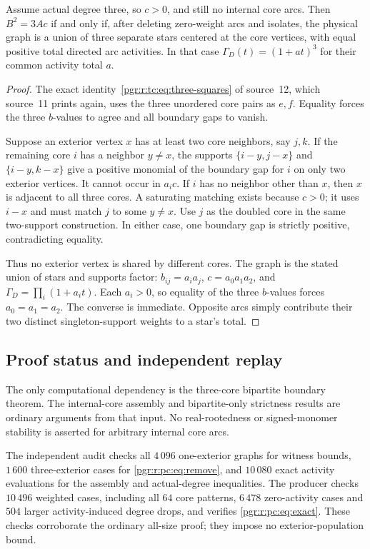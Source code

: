 \documentclass[11pt]{article}
\numberwithin{equation}{section}
\theoremstyle{definition}\newtheorem{definition}[theorem]{Definition}\newtheorem{remark}[theorem]{Remark}
\newcommand{\Ga}{\Gamma}                   %
\begin{document}
\begin{proposition}\label{pgr:r:pc:prop:equality}
Assume actual degree three, so $c>0$, and still no internal core arcs. Then
$B^2=3Ac$ if and only if, after deleting zero-weight arcs and isolates, the
physical graph is a union of three separate stars centered at the core
vertices, with equal positive total directed arc activities. In that case
$\Ga_D(t)=(1+at)^3$ for their common activity total $a$.
\end{proposition}
\begin{proof}
The exact identity~\eqref{pgr:r:tc:eq:three-squares} of source~12, which source~11 prints again,
uses the three unordered core pairs as $e,f$. Equality forces the three
$b$-values to agree and all boundary gaps to vanish.

Suppose an exterior vertex $x$ has at least two core neighbors, say $j,k$.
If the remaining core $i$ has a neighbor $y\ne x$, the supports
$\{i-y,j-x\}$ and $\{i-y,k-x\}$ give a positive monomial of the boundary
gap for $i$ on only two exterior vertices. It cannot occur in $a_ic$.
If $i$ has no neighbor other than $x$, then $x$ is adjacent to all three
cores. A saturating matching exists because $c>0$; it uses $i-x$ and must
match $j$ to some $y\ne x$. Use $j$ as the doubled core in the same
two-support construction. In either case, one boundary gap is strictly
positive, contradicting equality.

Thus no exterior vertex is shared by different cores. The graph is the
stated union of stars and supports factor:
$b_{ij}=a_ia_j$, $c=a_0a_1a_2$, and
$\Ga_D=\prod_i(1+a_it)$. Each $a_i>0$, so equality of the three $b$-values
forces $a_0=a_1=a_2$. The converse is immediate. Opposite arcs simply
contribute their two distinct singleton-support weights to a star's total.
\end{proof}

\subsection{Proof status and independent replay}
The only computational dependency is the three-core bipartite boundary
theorem. The internal-core assembly and bipartite-only strictness results
are ordinary arguments from that input. No real-rootedness or signed-monomer
stability is asserted for arbitrary internal core arcs.

The independent audit checks all $4\,096$ one-exterior graphs for witness
bounds, $1\,600$ three-exterior cases for \eqref{pgr:r:pc:eq:remove}, and $10\,080$
exact activity evaluations for the assembly and actual-degree inequalities.
The producer checks $10\,496$ weighted cases, including all $64$ core
patterns, $6\,478$ zero-activity cases and $504$ larger activity-induced
degree drops, and verifies \eqref{pgr:r:pc:eq:exact}. These checks corroborate the
ordinary all-size proof; they impose no exterior-population bound.
\end{document}
